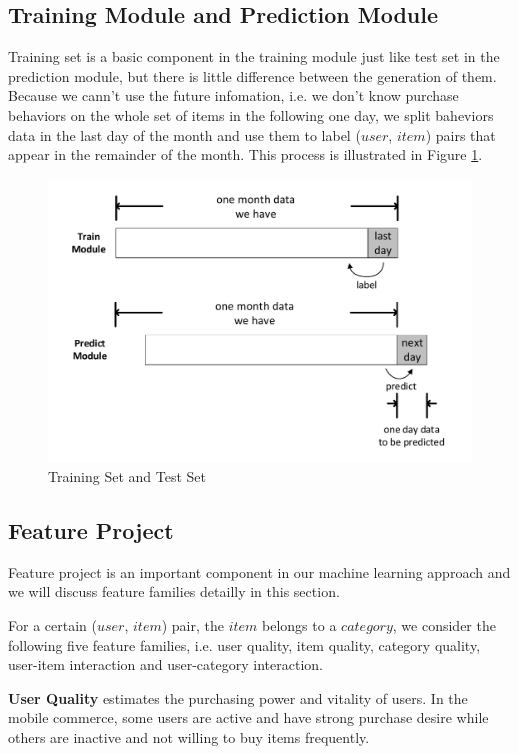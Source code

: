 \documentclass{llncs}
\begin{document}
\subsection{Training Module and Prediction Module}
Training set is a basic component in the training module just like
test set in the prediction module,
but there is little difference between the generation of them.
Because we cann't use the future infomation,
i.e. we don't know purchase behaviors
on the whole set of items in the following one day,
we split baheviors data in the last day of the month
and use them to label ($user$, $item$) pairs that appear
in the remainder of the month.
This process is illustrated in Figure \ref{fig:train_and_test}.

\begin{figure}[htbp]
	\centering
	\includegraphics[scale=0.4]{images/train_and_test.pdf}
	\caption{Training Set and Test Set}
	\label{fig:train_and_test}
\end{figure}

\subsection{Feature Project}
Feature project is an important component in our machine learning approach
and we will discuss feature families detailly in this section.

For a certain ($user$, $item$) pair, the $item$ belongs to a $category$,
we consider the following five feature families,
i.e. user quality, item quality, category quality, user-item interaction
and user-category interaction.

\textbf{User Quality} estimates the purchasing power and vitality of users.
In the mobile commerce, some users are active and have strong purchase desire
while others are inactive and not willing to buy items frequently.
\end{document}
